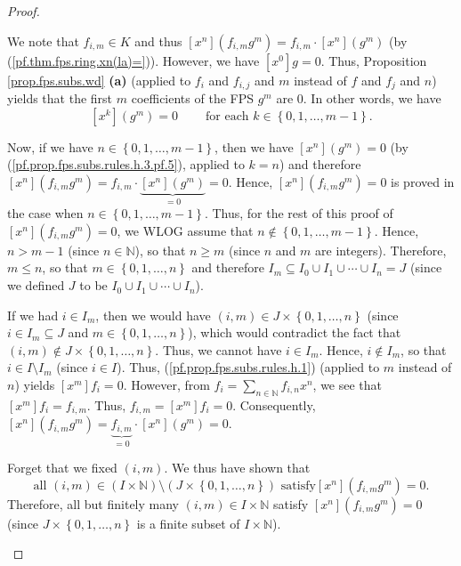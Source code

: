 \begin{proof}
\begin{fineprint}
We note that $f_{i,m}\in K$ and thus $\left[  x^{n}\right]  \left(
f_{i,m}g^{m}\right)  =f_{i,m}\cdot\left[  x^{n}\right]  \left(  g^{m}\right)
$ (by (\ref{pf.thm.fps.ring.xn(la)=})). However, we have $\left[
x^{0}\right]  g=0$. Thus, Proposition \ref{prop.fps.subs.wd} \textbf{(a)}
(applied to $f_{i}$ and $f_{i,j}$ and $m$ instead of $f$ and $f_{j}$ and $n$)
yields that the first $m$ coefficients of the FPS $g^{m}$ are $0$. In other
words, we have
\begin{equation}
\left[  x^{k}\right]  \left(  g^{m}\right)  =0\ \ \ \ \ \ \ \ \ \ \text{for
each }k\in\left\{  0,1,\ldots,m-1\right\}  .
\label{pf.prop.fps.subs.rules.h.3.pf.5}%
\end{equation}


Now, if we have $n\in\left\{  0,1,\ldots,m-1\right\}  $, then we have $\left[
x^{n}\right]  \left(  g^{m}\right)  =0$ (by
(\ref{pf.prop.fps.subs.rules.h.3.pf.5}), applied to $k=n$) and therefore
$\left[  x^{n}\right]  \left(  f_{i,m}g^{m}\right)  =f_{i,m}\cdot
\underbrace{\left[  x^{n}\right]  \left(  g^{m}\right)  }_{=0}=0$. Hence,
$\left[  x^{n}\right]  \left(  f_{i,m}g^{m}\right)  =0$ is proved in the case
when $n\in\left\{  0,1,\ldots,m-1\right\}  $. Thus, for the rest of this proof
of $\left[  x^{n}\right]  \left(  f_{i,m}g^{m}\right)  =0$, we WLOG assume
that $n\notin\left\{  0,1,\ldots,m-1\right\}  $. Hence, $n>m-1$ (since
$n\in\mathbb{N}$), so that $n\geq m$ (since $n$ and $m$ are integers).
Therefore, $m\leq n$, so that $m\in\left\{  0,1,\ldots,n\right\}  $ and
therefore $I_{m}\subseteq I_{0}\cup I_{1}\cup\cdots\cup I_{n}=J$ (since we
defined $J$ to be $I_{0}\cup I_{1}\cup\cdots\cup I_{n}$).

If we had $i\in I_{m}$, then we would have $\left(  i,m\right)  \in
J\times\left\{  0,1,\ldots,n\right\}  $ (since $i\in I_{m}\subseteq J$ and
$m\in\left\{  0,1,\ldots,n\right\}  $), which would contradict the fact that
$\left(  i,m\right)  \notin J\times\left\{  0,1,\ldots,n\right\}  $. Thus, we
cannot have $i\in I_{m}$. Hence, $i\notin I_{m}$, so that $i\in I\setminus
I_{m}$ (since $i\in I$). Thus, (\ref{pf.prop.fps.subs.rules.h.1}) (applied to
$m$ instead of $n$) yields $\left[  x^{m}\right]  f_{i}=0$. However, from
$f_{i}=\sum_{n\in\mathbb{N}}f_{i,n}x^{n}$, we see that $\left[  x^{m}\right]
f_{i}=f_{i,m}$. Thus, $f_{i,m}=\left[  x^{m}\right]  f_{i}=0$. Consequently,
$\left[  x^{n}\right]  \left(  f_{i,m}g^{m}\right)  =\underbrace{f_{i,m}}%
_{=0}\cdot\left[  x^{n}\right]  \left(  g^{m}\right)  =0$.

Forget that we fixed $\left(  i,m\right)  $. We thus have shown that
\[
\text{all }\left(  i,m\right)  \in\left(  I\times\mathbb{N}\right)
\setminus\left(  J\times\left\{  0,1,\ldots,n\right\}  \right)  \text{ satisfy
}\left[  x^{n}\right]  \left(  f_{i,m}g^{m}\right)  =0.
\]
Therefore, all but finitely many $\left(  i,m\right)  \in I\times\mathbb{N}$
satisfy $\left[  x^{n}\right]  \left(  f_{i,m}g^{m}\right)  =0$ (since
$J\times\left\{  0,1,\ldots,n\right\}  $ is a finite subset of $I\times
\mathbb{N}$).


\end{fineprint}
\end{proof}
